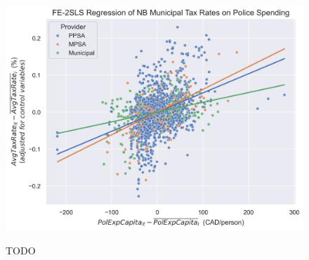 \begin{figure}[H]
    \centering
    \includegraphics[width=6in]{../data_visualization/fe_2sls.png}
    \\[-0.5cm]
    \caption{TODO}
\end{figure}